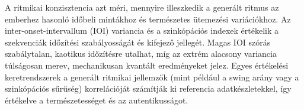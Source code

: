 A ritmikai konzisztencia azt méri, mennyire illeszkedik a generált ritmus az emberhez hasonló időbeli mintákhoz és természetes ütemezési variációkhoz. Az inter-onset-intervallum (IOI) variancia és a szinkópációs indexek értékelik a szekvenciák időzítési szabályosságát és kifejező jellegét. Magas IOI szórás szabálytalan, kaotikus időzítésre utalhat, míg az extrém alacsony variancia túlságosan merev, mechanikusan kvantált eredményeket jelez. Egyes értékelési keretrendszerek a generált ritmikai jellemzők (mint például a swing arány vagy a szinkópációs sűrűség) korrelációját számítják ki referencia adatkészletekkel, így értékelve a természetességet és az autentikusságot.